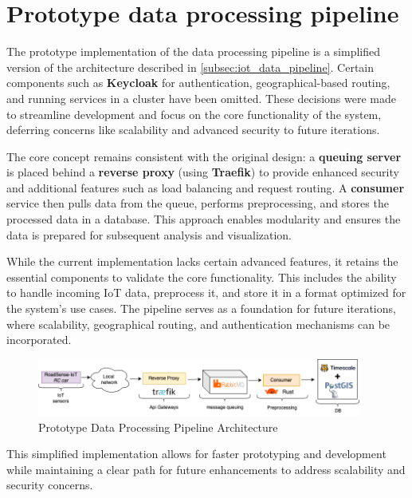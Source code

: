 \section{Prototype data processing pipeline}

The prototype implementation of the data processing pipeline is a simplified version of the architecture described in \autoref{subsec:iot_data_pipeline}. Certain components such as \textbf{Keycloak} for authentication, geographical-based routing, and running services in a cluster have been omitted. These decisions were made to streamline development and focus on the core functionality of the system, deferring concerns like scalability and advanced security to future iterations.

The core concept remains consistent with the original design: a \textbf{queuing server} is placed behind a \textbf{reverse proxy} (using \textbf{Traefik}) to provide enhanced security and additional features such as load balancing and request routing. A \textbf{consumer} service then pulls data from the queue, performs preprocessing, and stores the processed data in a database. This approach enables modularity and ensures the data is prepared for subsequent analysis and visualization.

While the current implementation lacks certain advanced features, it retains the essential components to validate the core functionality. This includes the ability to handle incoming IoT data, preprocess it, and store it in a format optimized for the system’s use cases. The pipeline serves as a foundation for future iterations, where scalability, geographical routing, and authentication mechanisms can be incorporated.

\begin{figure}[H]
	\begin{center}
		\includegraphics[width=0.95\textwidth]{../../assets/diagrams/prototype_pipeline/prototype_pipeline.png}
	\end{center}
	\caption{Prototype Data Processing Pipeline Architecture}
	\label{fig:prototype_pipeline}
\end{figure}

\noindent This simplified implementation allows for faster prototyping and development while maintaining a clear path for future enhancements to address scalability and security concerns.
